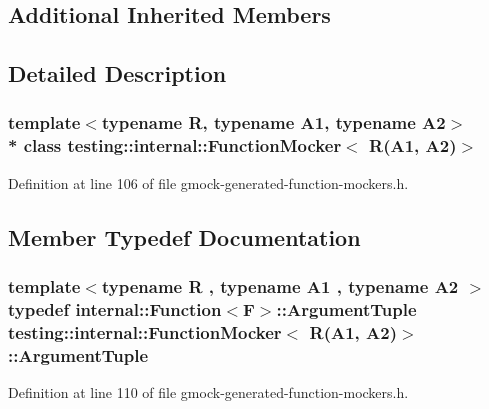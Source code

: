 \subsection*{Additional Inherited Members}


\subsection{Detailed Description}
\subsubsection*{template$<$typename R, typename A1, typename A2$>$\\*
class testing\+::internal\+::\+Function\+Mocker$<$ R(\+A1, A2)$>$}



Definition at line 106 of file gmock-\/generated-\/function-\/mockers.\+h.



\subsection{Member Typedef Documentation}
\subsubsection[{\texorpdfstring{Argument\+Tuple}{ArgumentTuple}}]{\setlength{\rightskip}{0pt plus 5cm}template$<$typename R , typename A1 , typename A2 $>$ typedef {\bf internal\+::\+Function}$<${\bf F}$>$\+::{\bf Argument\+Tuple} {\bf testing\+::internal\+::\+Function\+Mocker}$<$ {\bf R}(A1, A2)$>$\+::{\bf Argument\+Tuple}}\hypertarget{classtesting_1_1internal_1_1_function_mocker_3_01_r_07_a1_00_01_a2_08_4_ae75e3ba40a99224f7363681914212c19}{}\label{classtesting_1_1internal_1_1_function_mocker_3_01_r_07_a1_00_01_a2_08_4_ae75e3ba40a99224f7363681914212c19}


Definition at line 110 of file gmock-\/generated-\/function-\/mockers.\+h.

